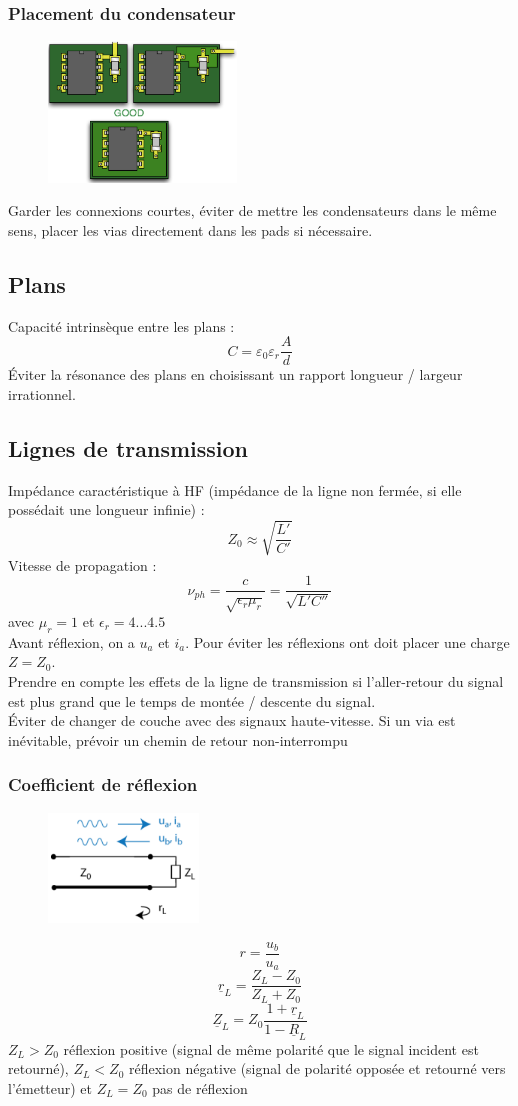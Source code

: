 \documentclass[resume]{subfiles}
\begin{document}
\begin{multicols}{3}
\subsubsection{Placement du condensateur}
\begin{figure}[H]
\centering
\includegraphics[width=5.00cm]{img_9.png}
\end{figure}
Garder les connexions courtes, éviter de mettre les condensateurs dans le même sens, placer les vias directement dans les pads si nécessaire.
\subsection{Plans}
Capacité intrinsèque entre les plans :
$$C=\varepsilon_0\varepsilon_r\frac{A}{d}$$
Éviter la résonance des plans en choisissant un rapport longueur / largeur irrationnel.
\subsection{Lignes de transmission}
Impédance caractéristique à HF (impédance de la ligne non fermée, si elle possédait une longueur infinie) :
$$Z_0\approx \sqrt{\frac{L'}{C'}} $$
Vitesse de propagation :
$$\nu_{ph} = \frac{c}{\sqrt{\epsilon_r \mu_r}} = \frac{1}{\sqrt{L' C''}}$$ avec $\mu_r = 1$ et $\epsilon_r =4...4.5$\\
Avant réflexion, on a $u_a$ et $i_a$. Pour éviter les réflexions ont doit placer une charge $Z=Z_0$.\\
Prendre en compte les effets de la ligne de transmission si l'aller-retour du signal est plus grand que le temps de montée / descente du signal.\\
Éviter de changer de couche avec des signaux haute-vitesse. Si un via est inévitable, prévoir un chemin de retour non-interrompu
\subsubsection{Coefficient de réflexion}
\begin{figure}[H]
\centering
\includegraphics[width=4.00cm]{img_13.png}
\end{figure}
$$r=\frac{u_b}{u_a}$$
$$\underline{r}_L=\frac{Z_L-Z_0}{Z_L+Z_0}$$
$$\underline{Z}_L=Z_0\frac{1+\underline{r}_L}{1-\underline{R}_L}$$
$Z_L>Z_0$ réflexion positive (signal de même polarité que le signal incident est retourné), $Z_L<Z_0$ réflexion négative (signal de polarité opposée et retourné vers l'émetteur) et $Z_L=Z_0$ pas de réflexion\\

\end{multicols}
\end{document}
